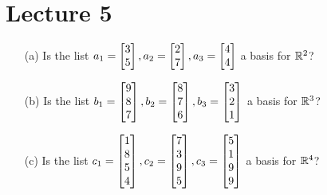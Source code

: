 \documentclass[a4paper]{amsart}
\begin{document}
\section{Lecture 5}

\begin{exercise}\label{ex-basis-i}
 \begin{itemize}
  \item[(a)] Is the list
   $a_1=\bbm 3\\5\ebm, a_2=\bbm 2\\7\ebm, a_3=\bbm 4\\4\ebm$
   a basis for $\R^2$?
  \item[(b)] Is the list
   $b_1=\bbm 9\\8\\7\ebm, b_2=\bbm 8\\7\\6\ebm, b_3=\bbm 3\\2\\1\ebm$
   a basis for $\R^3$?
  \item[(c)] Is the list 
   $c_1=\bbm 1\\8\\5\\4\ebm,
    c_2=\bbm 7\\3\\9\\5\ebm,
    c_3=\bbm 5\\1\\9\\9\ebm$
   a basis for $\R^4$?
 \end{itemize}
\end{exercise}
\end{document}

